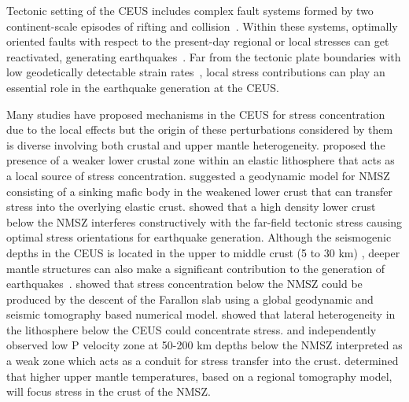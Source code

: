 \documentclass[draft,linenumbers]{agujournal2018}
\begin{document}
    Tectonic setting of the CEUS includes complex fault systems formed by two continent-scale episodes of rifting and collision~\citep[e.g.,][]{keller1983role, hoffman1989precambrian, thomas2006tectonic}. Within these systems, optimally oriented faults with respect to the present-day regional or local stresses can get reactivated, generating earthquakes~\citep[e.g.,][]{zoback1992stress, hurd2012intraplate}. Far from the tectonic plate boundaries with low geodetically detectable strain rates~\citep{Boyd_2015}, local stress contributions can play an essential role in the earthquake generation at the CEUS. 
    
    Many studies have proposed mechanisms in the CEUS for stress concentration due to the local effects but the origin of these perturbations considered by them is diverse involving both crustal and upper mantle heterogeneity. \citet{Kenner_2000a} proposed the presence of a weaker lower crustal zone within an elastic lithosphere that acts as a local source of stress concentration. \citet{Pollitz_2001} suggested a geodynamic model for NMSZ consisting of a sinking mafic body in the weakened lower crust that can transfer stress into the overlying elastic crust. \citet{levandowski2016dense} showed that a high density lower crust below the NMSZ interferes constructively with the far-field tectonic stress causing optimal stress orientations for earthquake generation.  Although the seismogenic depths in the CEUS is located in the upper to middle crust (5 to 30 km) \citep{vlahovic1998et1d, johnston1996seismic, mazzotti2010state}, deeper mantle structures can also make a significant contribution to the generation of  earthquakes~\citep[e.g.,][]{forte2007descent, li2007stress, chen2014crust, nyamwandha2016joint, zhan2016stress}. \citet{forte2007descent} showed that stress concentration below the NMSZ could be produced by the descent of the Farallon slab using a global geodynamic and seismic tomography based numerical model. \citet{li2007stress} showed that lateral heterogeneity in the lithosphere below the CEUS could concentrate stress. \citet{chen2014crust} and \citet{nyamwandha2016joint} independently observed low P velocity zone at 50-200 km depths below the NMSZ interpreted as a weak zone which acts as a conduit for stress transfer into the crust. \citet{zhan2016stress} determined that higher upper mantle temperatures, based on a regional tomography \citep{pollitz2014seismic}model, will focus stress in the crust of the NMSZ.
    
\end{document}
